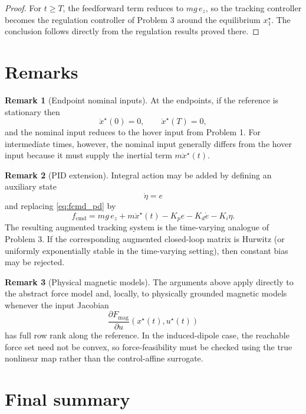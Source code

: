 \documentclass[11pt]{article}
\theoremstyle{definition}
\newtheorem{remark}{Remark}
\begin{document}
\begin{proof}
For $t\ge T$, the feedforward term reduces to $mg\,e_z$, so the tracking controller becomes the regulation controller of Problem 3 around the equilibrium $x_1^\star$. The conclusion follows directly from the regulation results proved there.
\end{proof}

\section{Remarks}

\begin{remark}[Endpoint nominal inputs]
At the endpoints, if the reference is stationary then
\[
 \ddot x^\star(0)=0,
 \qquad
 \ddot x^\star(T)=0,
\]
and the nominal input reduces to the hover input from Problem 1. For intermediate times, however, the nominal input generally differs from the hover input because it must supply the inertial term $m\ddot x^\star(t)$.
\end{remark}

\begin{remark}[PID extension]
Integral action may be added by defining an auxiliary state
\[
 \dot\eta = e
\]
and replacing \eqref{eq:fcmd_pd} by
\[
 f_{\mathrm{cmd}} = mg\,e_z + m\ddot x^\star(t) - K_p e - K_d\dot e - K_i\eta.
\]
The resulting augmented tracking system is the time-varying analogue of Problem 3. If the corresponding augmented closed-loop matrix is Hurwitz (or uniformly exponentially stable in the time-varying setting), then constant bias may be rejected.
\end{remark}

\begin{remark}[Physical magnetic models]
The arguments above apply directly to the abstract force model and, locally, to physically grounded magnetic models whenever the input Jacobian
\[
 \frac{\partial F_{\mathrm{mag}}}{\partial u}(x^\star(t),u^\star(t))
\]
has full row rank along the reference. In the induced-dipole case, the reachable force set need not be convex, so force-feasibility must be checked using the true nonlinear map rather than the control-affine surrogate.
\end{remark}

\section{Final summary}
\end{document}

